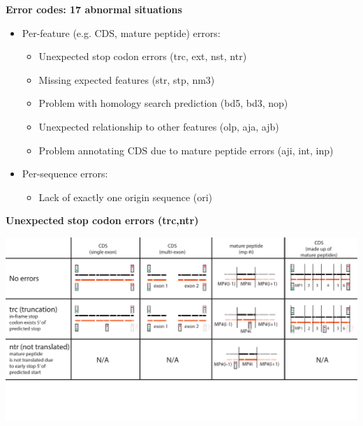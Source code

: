 \documentclass[landscape]{slides}
\begin{document}
\begin{slide}
\begin{center}
\textbf{Error codes: 17 abnormal situations}

\small
\begin{itemize}
\item Per-feature (e.g. CDS, mature peptide) errors:
\begin{itemize}
\item Unexpected stop codon errors (trc, ext, nst, ntr)
\item Missing expected features (str, stp, nm3)
\item Problem with homology search prediction (bd5, bd3, nop)
\item Unexpected relationship to other features (olp, aja, ajb)
\item Problem annotating CDS due to mature peptide errors (aji, int, inp)
\end{itemize}
\item Per-sequence errors:
\begin{itemize} 
\item Lack of exactly one origin sequence (ori)
\end{itemize}
\end{itemize}

\end{center}
\vfill
\end{slide}
\begin{slide}
\begin{center}
\textbf{Unexpected stop codon errors (trc,ntr)}
\vspace{0.5in}

\includegraphics[width=10in]{figs/error-1-trc-ntr}
\end{center}
\vfill
\end{slide}
\end{document}
